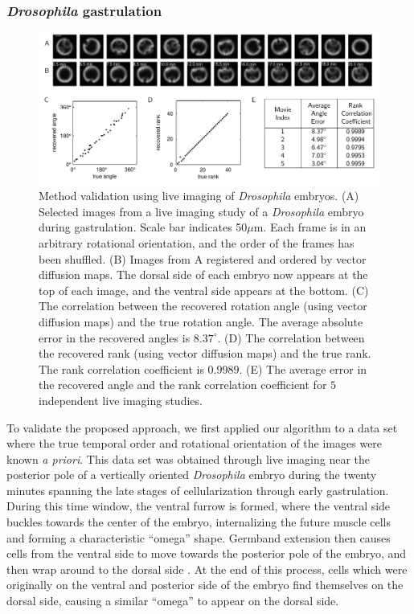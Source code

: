 \subsubsection{{\em Drosophila} gastrulation}

\begin{figure}[t]
\includegraphics[width=\textwidth]{fig3}
\caption[Method validation using live imaging of \textit{Drosophila} embryos]{Method validation using live imaging of \textit{Drosophila} embryos. (A) Selected images from a live imaging study of a \textit{Drosophila} embryo during gastrulation. Scale bar indicates 50$\mu$m. Each frame is in an arbitrary rotational orientation, and the order of the frames has been shuffled. (B) Images from A registered and ordered by vector diffusion maps. The dorsal side of each embryo now appears at the top of each image, and the ventral side appears at the bottom. (C) The correlation between the recovered rotation angle (using vector diffusion maps) and the true rotation angle. The average absolute error in the recovered angles is $8.37 ^\circ$. (D) The correlation between the recovered rank (using vector diffusion maps) and the true rank. The rank correlation coefficient is $0.9989$. (E) The average error in the recovered angle and the rank correlation coefficient for $5$ independent live imaging studies. }
\label{fig:drosophila_live_imaging}
\end{figure}

To validate the proposed approach, we first applied our algorithm to a data set where the true temporal order and rotational orientation of the images were known {\em a priori}.
%
This data set was obtained through live imaging near the posterior pole of a vertically oriented {\it Drosophila} embryo during the twenty minutes spanning the late stages of cellularization through early gastrulation.
%
During this time window, the ventral furrow is formed, where the ventral side buckles towards the center of the embryo, internalizing the future muscle cells and forming a characteristic ``omega'' shape.
%
Germband extension then causes cells from the ventral side to move towards the posterior pole of the embryo, and then wrap around to the dorsal side \citep{leptin2005gastrulation}.
%
At the end of this process, cells which were originally on the ventral and posterior side of the embryo find themselves on the dorsal side, causing a similar ``omega'' to appear on the dorsal side.

